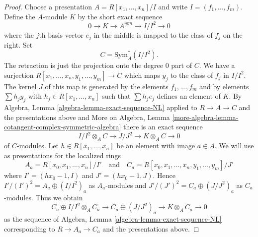 \begin{proof}
Choose a presentation $A = R[x_1, \ldots, x_n]/I$ and write
$I = (f_1, \ldots, f_m)$. Define the $A$-module $K$ by the short exact sequence
$$
0 \to K \to A^{\oplus m} \to I/I^2 \to 0
$$
where the $j$th basis vector $e_j$ in the middle is mapped to the class of
$f_j$ on the right. Set
$$
C = \text{Sym}^*_A(I/I^2).
$$
The retraction is just the projection onto the degree $0$ part of $C$.
We have a surjection $R[x_1, \ldots, x_n, y_1, \ldots, y_m] \to C$
which maps $y_j$ to the class of $f_j$ in $I/I^2$. The kernel $J$ of this
map is generated by the elements $f_1, \ldots, f_m$ and by elements
$\sum h_j y_j$ with $h_j \in R[x_1, \ldots, x_n]$ such that
$\sum h_j e_j$ defines an element of $K$. By
Algebra, Lemma \ref{algebra-lemma-exact-sequence-NL}
applied to $R \to A \to C$ and the presentations above and
More on Algebra, Lemma
\ref{more-algebra-lemma-cotangent-complex-symmetric-algebra}
there is an exact sequence
\begin{equation}
\label{equation-sequence}
I/I^2 \otimes_A C \to J/J^2 \to K \otimes_A C \to 0
\end{equation}
of $C$-modules. Let $h \in R[x_1, \ldots, x_n]$ be an element
with image $a \in A$. We will use as presentations for the localized rings
$$
A_a = R[x_0, x_1, \ldots, x_n]/I'
\quad\text{and}\quad
C_a = R[x_0, x_1, \ldots, x_n, y_1, \ldots, y_m]/J'
$$
where $I' = (hx_0 - 1, I)$ and $J' = (hx_0 - 1, J)$. Hence
$I'/(I')^2 = A_a \oplus (I/I^2)_a$ as $A_a$-modules and
$J'/(J')^2 = C_a \oplus (J/J^2)_a$ as $C_a$-modules.
Thus we obtain
\begin{equation}
\label{equation-sequence-localized}
C_a \oplus I/I^2 \otimes_A C_a \to
C_a \oplus (J/J^2)_a \to
K \otimes_A C_a \to 0
\end{equation}
as the sequence of
Algebra, Lemma \ref{algebra-lemma-exact-sequence-NL}
corresponding to $R \to A_a \to C_a$ and the presentations above.


\end{proof}
